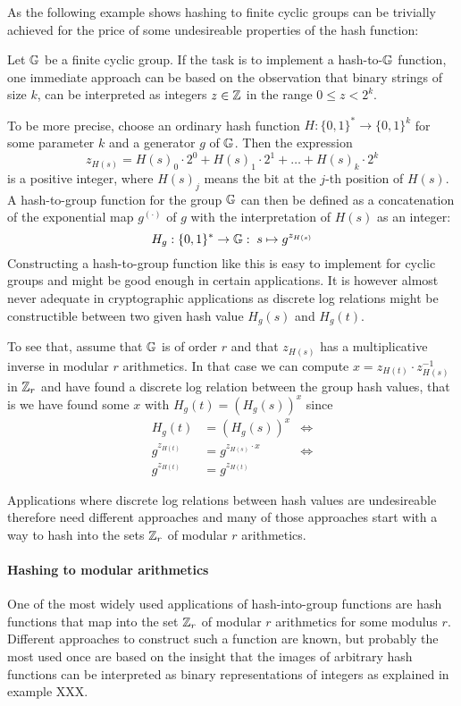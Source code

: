As the following example shows hashing to finite cyclic groups can be trivially achieved for the price of some undesireable properties of the hash function:
\begin{example} Let $\mathbb{G}$ be a finite cyclic group. If the task is to implement a hash-to-$\mathbb{G}$ function, one immediate approach can be based on the observation that binary strings of size $k$, can be interpreted as integers $z\in\mathbb{Z}$ in the range $0\leq z < 2^k$. 

To be more precise, choose an ordinary hash function $H:\{0,1\}^*\to \{0,1\}^k$ for some parameter $k$ and a generator $g$ of $\mathbb{G}$. Then the expression
$$
z_{H(s)}= H(s)_0\cdot 2^0 + H(s)_1\cdot 2^1 + \ldots + H(s)_k \cdot 2^k
$$
is a positive integer, where $H(s)_j$ means the bit at the $j$-th position of $H(s)$. A hash-to-group function for the group $\mathbb{G}$ can then be defined as a concatenation of the exponential map $g^{(\cdot)}$ of $g$ with the interpretation of $H(s)$ as an integer: 
$$
H_{g} : \{0,1\}^* \to \mathbb{G}:\; s \mapsto g^{z_{H(s)}} 
$$
Constructing a hash-to-group function like this is easy to implement for cyclic groups and might be good enough in certain applications. It is however almost never adequate in cryptographic applications as discrete log relations might be constructible between two given hash value $H_g(s)$ and $H_g(t)$. 

To see that, assume that $\mathbb{G}$ is of order $r$ and that $z_{H(s)}$ has a multiplicative inverse in modular $r$ arithmetics. In that case we can compute $x=z_{H(t)}\cdot z_{H(s)}^{-1}$ in $\mathbb{Z}_r$ and have found a discrete log relation between the group hash values, that is we have found some $x$ with $H_g(t) = (H_g(s))^x$ since
\begin{align*}
H_g(t) & = (H_g(s))^x & \Leftrightarrow \\
g^{z_{H(t)}} & = g^{z_{H(s)}\cdot x} & \Leftrightarrow \\
g^{z_{H(t)}} & = g^{z_{H(t)}}
\end{align*}
\end{example}
Applications where discrete log relations between hash values are undesireable therefore need different approaches and many of those approaches start with a way to hash into the sets $\mathbb{Z}_r$ of modular $r$ arithmetics. 
\paragraph{Hashing to modular arithmetics} One of the most widely used applications of hash-into-group functions are hash functions that map into the set $\mathbb{Z}_r$ of modular $r$ arithmetics for some modulus $r$. Different approaches to construct such a function are known, but probably the most used once are based on the insight that the images of arbitrary hash functions can be interpreted as binary representations of integers as explained in example XXX.

